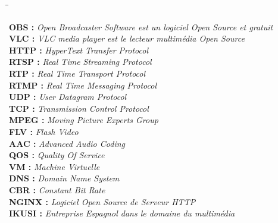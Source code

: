 \documentclass{report}
\begin{document}
\begin{tabbing}
\hspace{3cm}\=\hspace{2cm}\=\kill


\textbf{OBS : }  \> \textit{ Open Broadcaster Software est un logiciel Open Source et gratuit}\\ 

\textbf{VLC : } \>\textit{ VLC media player est le lecteur multimédia  Open Source}\\ 

\textbf{HTTP : }\> \textit{ HyperText Transfer Protocol}\\ 

\textbf{RTSP : } \>\textit{ Real Time Streaming Protocol}\\

\textbf{RTP : } \>\textit{ Real Time Transport Protocol}\\

\textbf{RTMP : } \>\textit{ Real Time Messaging Protocol}\\

\textbf{UDP : } \>\textit{ User Datagram Protocol}\\

\textbf{TCP :}\> \textit{ Transmission Control Protocol}\\

\textbf{MPEG : } \>\textit{ Moving Picture Experts Group}\\

\textbf{FLV : }\> \textit{ Flash Video}\\

\textbf{AAC : } \>\textit{ Advanced Audio Coding}\\

\textbf{QOS : }\> \textit{ Quality Of Service}\\

\textbf{VM : } \>\textit{ Machine Virtuelle}\\

\textbf{DNS :}\>\textit{  Domain Name System}\\

\textbf{CBR :}\>\textit{  Constant Bit Rate}\\

\textbf{NGINX : }\> \textit{ Logiciel  Open Source de Serveur HTTP }\\

\textbf{IKUSI : } \>\textit{ Entreprise Espagnol dans le domaine du multimédia}\\


\end{tabbing}
\end{document}
